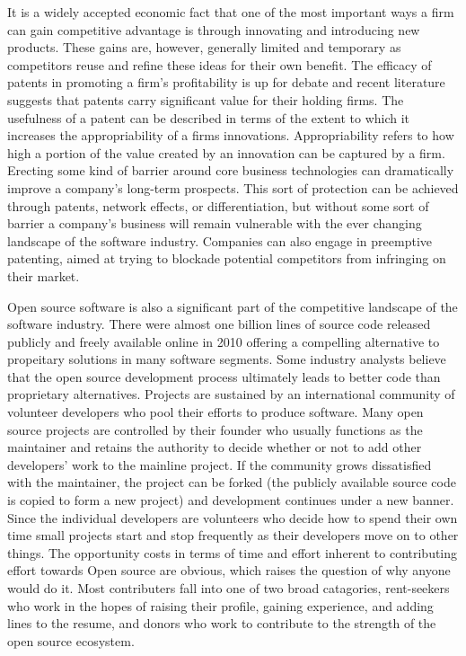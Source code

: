 It is a widely accepted economic fact that one of the most important ways a firm can gain competitive advantage is through innovating and introducing new products.
These gains are, however, generally limited and temporary as competitors reuse and refine these ideas for their own benefit.\autocite[81]{ceccagnoli2007appropriability}
The efficacy of patents in promoting a firm's profitability is up for debate and recent literature suggests that patents carry significant value for their holding firms.\autocite[]{ceccagnoli2007appropriability}
The usefulness of a patent can be described in terms of the extent to which it increases the appropriability of a firms innovations.\autocite[81]{ceccagnoli2007appropriability}
Appropriability refers to how high a portion of the value created by an innovation can be captured by a firm.\autocite[82]{ceccagnoli2007appropriability}
Erecting some kind of barrier around core business technologies can dramatically improve a company's long-term prospects.\autocite[]{HorizontalPlaysTechnology}
This sort of protection can be achieved through patents, network effects, or differentiation, but without some sort of barrier a company's business will remain vulnerable with the ever changing landscape of the software industry.\autocite[]{HorizontalPlaysTechnology}
Companies can also engage in preemptive patenting, aimed at trying to blockade potential competitors from infringing on their market.\autocite[83]{ceccagnoli2007appropriability}

Open source software is also a significant part of the competitive landscape of the software industry.
There were almost one billion lines of source code released publicly and freely available online in 2010 offering a compelling alternative to propeitary solutions in many software segments.\autocite[]{OptimismInnovation}
Some industry analysts believe that the open source development process ultimately leads to better code than proprietary alternatives.\autocite[]{OptimismInnovation}
Projects are sustained by an international community of volunteer developers who pool their efforts to produce software.\autocite[191]{buxmann2012software}
Many open source projects are controlled by their founder who usually functions as the maintainer and retains the authority to decide whether or not to add other developers' work to the mainline project.
If the community grows dissatisfied with the maintainer, the project can be forked (the publicly available source code is copied to form a new project) and development continues under a new banner.
Since the individual developers are volunteers who decide how to spend their own time small projects start and stop frequently as their developers move on to other things.\autocite[197]{buxmann2012software}
The opportunity costs in terms of time and effort inherent to contributing effort towards Open source are obvious, which raises the question of why anyone would do it.
Most contributers fall into one of two broad catagories, rent-seekers who work in the hopes of raising their profile, gaining experience, and adding lines to the resume, and donors who work to contribute to the strength of the open source ecosystem.\autocite[198]{buxmann2012software}

